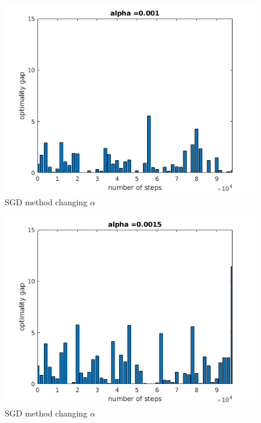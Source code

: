 \documentclass[a4paper, 11pt]{article}
\begin{document}
\begin{figure}[htbp]
\centering
\includegraphics[scale=0.7]{figure/p1_2_2.png}
\caption{SGD method changing $\alpha$}
\label{p1_2_2}
\end{figure}

\begin{figure}[htbp]
\centering
\includegraphics[scale=0.7]{figure/p1_2_3.png}
\caption{SGD method changing $\alpha$}
\label{p1_2_3}
\end{figure}
\end{document}
